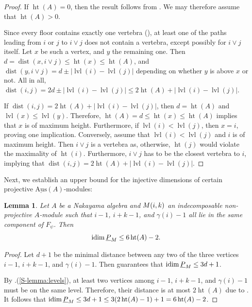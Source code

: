 \documentclass[a4paper]{amsart}
\newtheorem{lemma}[theorem]{Lemma}
\theoremstyle{definition}
\theoremstyle{remark}
\numberwithin{equation}{theorem}
\newcommand{\sAus}{\operatorname{\underline{Aus}}}
\newcommand{\height}{\operatorname{ht}}
\newcommand{\dist}{\operatorname{dist}}
\newcommand{\level}{\operatorname{lvl}}
\newcommand{\psiforest}{F_\psi}
\begin{document}
\begin{proof}
    If $ \height(A) = 0 $, then the result follows from . We may therefore assume that $ \height(A) > 0 $.

    Since every floor contains exactly one vertebra (), at least one of the paths leading from $ i$ or $ j $ to $ i \vee j $ does not contain a vertebra, except possibly for $ i \vee j $ itself. Let $ x $ be such a vertex, and $ y $ the remaining one.
    Then $ d = \dist(x,i\vee j) \leq \height(x) \leq \height(A) $, and $ \dist(y,i\vee j) = d \pm | \level(i) - \level(j) | $ depending on whether $ y $ is above $ x $ or not. All in all, $ \dist(i,j) = 2d \pm | \level(i) - \level(j) | \leq 2 \height(A) + | \level(i) - \level(j) | $.

    If $ \dist(i,j) = 2 \height(A) + | \level(i) - \level(j) | $, then $ d = \height (A) $ and $ \level(x) \leq \level(y) $. Therefore, $ \height (A) = d \leq \height(x) \leq \height(A) $ implies that $ x $ is of maximum height.
    Furthermore, if $ \level(i) < \level(j) $, then $ x=i $, proving one implication.
    Conversely, assume that $ \level(i) < \level(j) $ and $ i $ is of maximum height. Then $ i\vee j $ is a vertebra as, otherwise, $ \height(j) $ would violate the maximality of $ \height(i) $. Furthermore, $i\vee j $ has to be the closest vertebra to $ i $, implying that $\dist(i,j) = 2 \height(A) + | \level(i) - \level(j) | $.
\end{proof}

Next, we establish an upper bound for the injective dimensions of certain projective $ \sAus(A) $-modules:
\begin{lemma}\label{lemma:idim:bound:same:tree}
    Let $A$ be a Nakayama algebra and $\mik$ an indecomposable non-projective $A$-module such that $i-1$, $i+k-1$, and $\gamma(i) - 1$ all lie in the same component of $\psiforest$.
    Then \[\stabidim \leq 6\height(A) - 2.\]
\end{lemma}
\begin{proof}
    Let $d+1$ be the minimal distance between any two of the three vertices $i-1$, $i+k-1$, and $\gamma(i) - 1$.  Then  guarantees that $\stabidim\leq 3d+1$.

    By .(\ref{S-lemma:levels}), at least two vertices among $i-1$, $i+k-1$, and $\gamma(i) - 1$ must be on the same level.  Therefore, their distance is at most $2\height(A)$ due to .  It follows that $\stabidim \leq 3d+1\leq 3(2\height(A) - 1) + 1 = 6\height(A) - 2$.
\end{proof}
\end{document}
